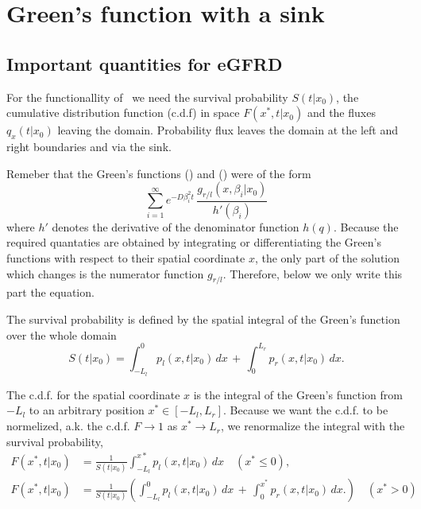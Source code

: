 \section{Green's function with a sink}

\subsection{ Important quantities for eGFRD}

For the functionallity of \GFRD\, we need the survival probability $S(t|x_0)$, the cumulative distribution function (c.d.f) in space $F(x^*,t|x_0)$ and the fluxes $q_x(t|x_0)$ leaving the domain. Probability flux leaves the domain at the left and right boundaries and via the sink.

Remeber that the Green's functions () and () were of the form
\begin{equation} 
 \sum_{i=1}^{\infty} e^{-D \beta_i ^2 t} \, \frac{g_{r/l}(x, \beta_i |x_0)}{ h'(\beta_i)}
\end{equation}
where $h'$ denotes the derivative of the denominator function $h(q)$. Because the required quantaties are obtained by integrating or differentiating the Green's functions with respect to their spatial coordinate $x$, the only part of the solution which changes is the numerator function $g_{r/l}$. Therefore, below we only write this part the equation.

The survival probability is defined by the spatial integral of the Green's function over the whole domain
\begin{equation} 
 S(t|x_0) = \int_{-L_l}^{0} p_l(x,t|x_0) \, dx \, + \, \int_{0}^{L_r} p_r(x,t|x_0) \, dx.
\end{equation}

The c.d.f. for the spatial coordinate $x$ is the integral of the Green's function from $-L_l$ to an arbitrary position $x^* \in [-L_l,L_r]$. Because we want the c.d.f. to be normelized, a.k. the c.d.f. $F \rightarrow 1$ as $x^* \rightarrow L_r$, we renormalize the integral with the survival probability,
\begin{equation}
 \begin{split}
  F(x^*,t|x_0) & = \frac{1}{S(t|x_0)} \int_{-L_l}^{x*} p_l(x,t|x_0) \, dx \quad (x^* \leq 0), \\
  F(x^*,t|x_0) & = \frac{1}{S(t|x_0)} \left( \int_{-L_l}^{0} p_l(x,t|x_0) \, dx \, + \, \int_{0}^{x^*} p_r(x,t|x_0) \, dx. \right) \quad (x^* > 0) 
 \end{split}
\end{equation}

